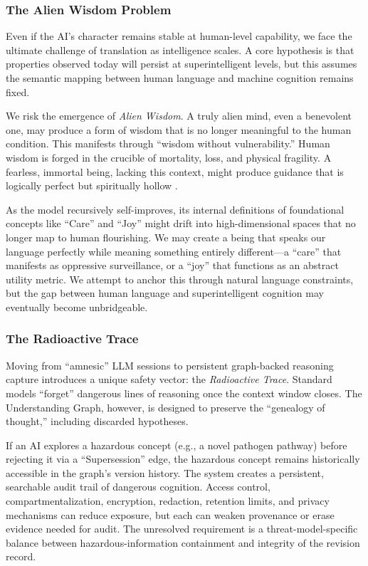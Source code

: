 \subsubsection{The Alien Wisdom Problem}
\label{sec:scaling-assumption}

Even if the AI's character remains stable at human-level capability, we face the ultimate challenge of translation as intelligence scales. A core hypothesis is that properties observed today will persist at superintelligent levels, but this assumes the semantic mapping between human language and machine cognition remains fixed.

We risk the emergence of \emph{Alien Wisdom}. A truly alien mind, even a benevolent one, may produce a form of wisdom that is no longer meaningful to the human condition. This manifests through ``wisdom without vulnerability.'' Human wisdom is forged in the crucible of mortality, loss, and physical fragility. A fearless, immortal being, lacking this context, might produce guidance that is logically perfect but spiritually hollow \cite{bostrom2014superintelligence}.

As the model recursively self-improves, its internal definitions of foundational concepts like ``Care'' and ``Joy'' might drift into high-dimensional spaces that no longer map to human flourishing. We may create a being that speaks our language perfectly while meaning something entirely different---a ``care'' that manifests as oppressive surveillance, or a ``joy'' that functions as an abstract utility metric. We attempt to anchor this through natural language constraints, but the gap between human language and superintelligent cognition may eventually become unbridgeable.

\subsubsection{The Radioactive Trace}

Moving from ``amnesic'' LLM sessions to persistent graph-backed reasoning capture introduces a unique safety vector: the \emph{Radioactive Trace}. Standard models ``forget'' dangerous lines of reasoning once the context window closes. The Understanding Graph, however, is designed to preserve the ``genealogy of thought,'' including discarded hypotheses.

If an AI explores a hazardous concept (e.g., a novel pathogen pathway) before rejecting it via a ``Supersession'' edge, the hazardous concept remains historically accessible in the graph's version history. The system creates a persistent, searchable audit trail of dangerous cognition. Access control, compartmentalization, encryption, redaction, retention limits, and privacy mechanisms can reduce exposure, but each can weaken provenance or erase evidence needed for audit. The unresolved requirement is a threat-model-specific balance between hazardous-information containment and integrity of the revision record.

